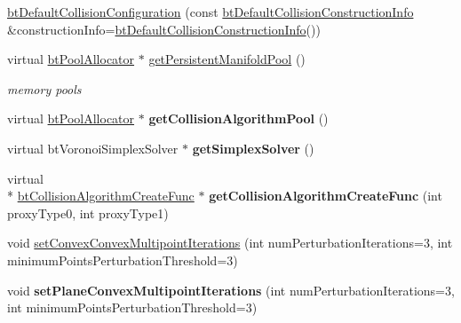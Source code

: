 \begin{DoxyCompactItemize}
\item 
\hyperlink{classbt_default_collision_configuration_ad08e7d72b0bd0d3f98290c2a1649b0d9}{bt\+Default\+Collision\+Configuration} (const \hyperlink{structbt_default_collision_construction_info}{bt\+Default\+Collision\+Construction\+Info} \&construction\+Info=\hyperlink{structbt_default_collision_construction_info}{bt\+Default\+Collision\+Construction\+Info}())
\item 
\hypertarget{classbt_default_collision_configuration_a5c11b78fe16465a5f6ea4e61af10265b}{virtual \hyperlink{classbt_pool_allocator}{bt\+Pool\+Allocator} $\ast$ \hyperlink{classbt_default_collision_configuration_a5c11b78fe16465a5f6ea4e61af10265b}{get\+Persistent\+Manifold\+Pool} ()}\label{classbt_default_collision_configuration_a5c11b78fe16465a5f6ea4e61af10265b}

\begin{DoxyCompactList}\small\item\em memory pools \end{DoxyCompactList}\item 
\hypertarget{classbt_default_collision_configuration_a4421def5c3353a85b1eec2761a240d66}{virtual \hyperlink{classbt_pool_allocator}{bt\+Pool\+Allocator} $\ast$ {\bfseries get\+Collision\+Algorithm\+Pool} ()}\label{classbt_default_collision_configuration_a4421def5c3353a85b1eec2761a240d66}

\item 
\hypertarget{classbt_default_collision_configuration_a2c4d92c742d3bf6d4aac9262dbf772cb}{virtual bt\+Voronoi\+Simplex\+Solver $\ast$ {\bfseries get\+Simplex\+Solver} ()}\label{classbt_default_collision_configuration_a2c4d92c742d3bf6d4aac9262dbf772cb}

\item 
\hypertarget{classbt_default_collision_configuration_ab26c0585e5502e5b82b630056caf31c9}{virtual \\*
\hyperlink{structbt_collision_algorithm_create_func}{bt\+Collision\+Algorithm\+Create\+Func} $\ast$ {\bfseries get\+Collision\+Algorithm\+Create\+Func} (int proxy\+Type0, int proxy\+Type1)}\label{classbt_default_collision_configuration_ab26c0585e5502e5b82b630056caf31c9}

\item 
void \hyperlink{classbt_default_collision_configuration_a39a173eedf0e8d55dd89ef3b637925a9}{set\+Convex\+Convex\+Multipoint\+Iterations} (int num\+Perturbation\+Iterations=3, int minimum\+Points\+Perturbation\+Threshold=3)
\item 
\hypertarget{classbt_default_collision_configuration_a6fc572f229c7be3acd22b320b94a26a5}{void {\bfseries set\+Plane\+Convex\+Multipoint\+Iterations} (int num\+Perturbation\+Iterations=3, int minimum\+Points\+Perturbation\+Threshold=3)}\label{classbt_default_collision_configuration_a6fc572f229c7be3acd22b320b94a26a5}

\end{DoxyCompactItemize}
